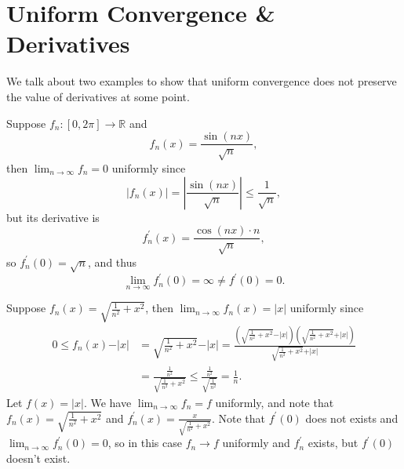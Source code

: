 \section{Uniform Convergence \& Derivatives}
We talk about two examples to show that uniform convergence does not preserve the value of derivatives at some point.
\begin{eg}
    Suppose \(f_n: [0, 2\pi ] \to \mathbb{R} \) and 
    \[
        f_n(x) = \frac{\sin (nx)}{\sqrt{n} },
    \] then \(\lim_{n \to \infty} f_n = 0 \) uniformly since 
    \[
        \left\vert f_n(x) \right\vert = \left\vert \frac{\sin (nx)}{\sqrt{n} } \right\vert \le \frac{1}{\sqrt{n} },  
    \] but its derivative is 
    \[
        f_n^{\prime} (x) = \frac{\cos (nx) \cdot n}{\sqrt{n} },
    \] so \(f_n^{\prime} (0) = \sqrt{n} \), and thus
    \[
        \lim_{n \to \infty} f_n^{\prime} (0) = \infty \neq f^{\prime} (0) = 0.
    \]  
\end{eg}

\begin{eg}
    Suppose \(f_n(x) = \sqrt{\frac{1}{n^2} + x^2} \), then \(\lim_{n \to \infty} f_n (x) = \vert x \vert  \) uniformly since 
    \begin{align*}
        0 \le f_n(x) - \vert x \vert &= \sqrt{\frac{1}{n^2} + x^2} - \vert x \vert = \frac{\left( \sqrt{\frac{1}{n^2} + x^2} - \vert x \vert   \right) \left( \sqrt{\frac{1}{n^2} + x^2} + \vert x \vert    \right)  }{\sqrt{\frac{1}{n^2} + x^2} + \vert x \vert  } \\
        &= \frac{\frac{1}{n^2}}{\sqrt{\frac{1}{n^2} + x^2} } \le \frac{\frac{1}{n^2}}{\sqrt{\frac{1}{n^2}} } = \frac{1}{n}.
    \end{align*}
    Let \(f(x) = \vert x \vert \). We have \(\lim_{n \to \infty} f_n = f \) uniformly, and note that \(f_n(x) = \sqrt{\frac{1}{n^2} + x^2} \) and \(f_n^{\prime} (x) = \frac{x}{\sqrt{\frac{1}{n^2} + x^2} }\). Note that \(f^{\prime} (0)\) does not exists and \(\lim_{n \to \infty} f_n^{\prime} (0) = 0 \), so in this case \(f_n \to f\) uniformly and \(f_n^{\prime} \) exists, but \(f^{\prime} (0)\) doesn't exist.      
\end{eg}

